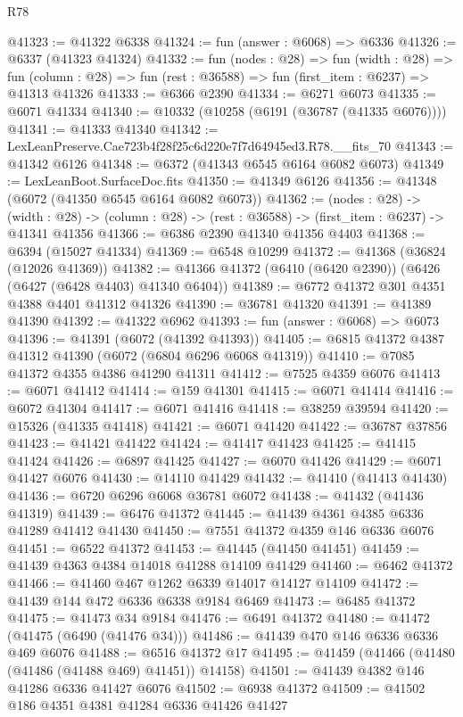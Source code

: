 \begin{lexlean}{R78}
\begin{coremodule}
@41323 := @41322 @6338
@41324 := fun (answer : @6068) => @6336
@41326 := @6337 (@41323 @41324)
@41332 := fun (nodes : @28) =>
  fun (width : @28) =>
  fun (column : @28) => fun (rest : @36588) => fun (first_item : @6237) => @41313 @41326
@41333 := @6366 @2390
@41334 := @6271 @6073
@41335 := @6071 @41334
@41340 := @10332 (@10258 (@6191 (@36787 (@41335 @6076))))
@41341 := @41333 @41340
@41342 := LexLeanPreserve.Cae723b4f28f25c6d220e7f7d64945ed3.R78.__fits_70
@41343 := @41342 @6126
@41348 := @6372 (@41343 @6545 @6164 @6082 @6073)
@41349 := LexLeanBoot.SurfaceDoc.fits
@41350 := @41349 @6126
@41356 := @41348 (@6072 (@41350 @6545 @6164 @6082 @6073))
@41362 := (nodes : @28) ->
  (width : @28) -> (column : @28) -> (rest : @36588) -> (first_item : @6237) -> @41341 @41356
@41366 := @6386 @2390 @41340 @41356 @4403
@41368 := @6394 (@15027 @41334)
@41369 := @6548 @10299
@41372 := @41368 (@36824 (@12026 @41369))
@41382 := @41366 @41372 (@6410 (@6420 @2390)) (@6426 (@6427 (@6428 @4403) @41340 @6404))
@41389 := @6772 @41372 @301 @4351 @4388 @4401 @41312 @41326
@41390 := @36781 @41320
@41391 := @41389 @41390
@41392 := @41322 @6962
@41393 := fun (answer : @6068) => @6073
@41396 := @41391 (@6072 (@41392 @41393))
@41405 := @6815 @41372 @4387 @41312 @41390 (@6072 (@6804 @6296 @6068 @41319))
@41410 := @7085 @41372 @4355 @4386 @41290 @41311
@41412 := @7525 @4359 @6076
@41413 := @6071 @41412
@41414 := @159 @41301
@41415 := @6071 @41414
@41416 := @6072 @41304
@41417 := @6071 @41416
@41418 := @38259 @39594
@41420 := @15326 (@41335 @41418)
@41421 := @6071 @41420
@41422 := @36787 @37856
@41423 := @41421 @41422
@41424 := @41417 @41423
@41425 := @41415 @41424
@41426 := @6897 @41425
@41427 := @6070 @41426
@41429 := @6071 @41427 @6076
@41430 := @14110 @41429
@41432 := @41410 (@41413 @41430)
@41436 := @6720 @6296 @6068 @36781 @6072
@41438 := @41432 (@41436 @41319)
@41439 := @6476 @41372
@41445 := @41439 @4361 @4385 @6336 @41289 @41412 @41430
@41450 := @7551 @41372 @4359 @146 @6336 @6076
@41451 := @6522 @41372
@41453 := @41445 (@41450 @41451)
@41459 := @41439 @4363 @4384 @14018 @41288 @14109 @41429
@41460 := @6462 @41372
@41466 := @41460 @467 @1262 @6339 @14017 @14127 @14109
@41472 := @41439 @144 @472 @6336 @6338 @9184 @6469
@41473 := @6485 @41372
@41475 := @41473 @34 @9184
@41476 := @6491 @41372
@41480 := @41472 (@41475 (@6490 (@41476 @34)))
@41486 := @41439 @470 @146 @6336 @6336 @469 @6076
@41488 := @6516 @41372 @17
@41495 := @41459 (@41466 (@41480 (@41486 (@41488 @469) @41451)) @14158)
@41501 := @41439 @4382 @146 @41286 @6336 @41427 @6076
@41502 := @6938 @41372
@41509 := @41502 @186 @4351 @4381 @41284 @6336 @41426 @41427

\end{coremodule}
\end{lexlean}
